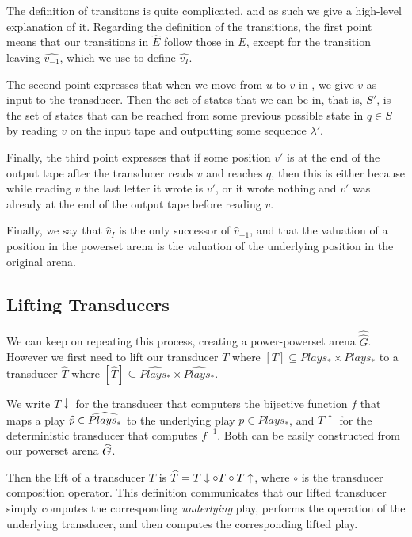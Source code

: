 \documentclass[10pt, a4paper]{report}
\begin{document}
The definition of transitons is quite complicated, and as such we give a high-level
explanation of it. Regarding the definition of the transitions,
the first point means that our transitions in $\widehat{E}$ follow those in $E$,
except for the transition leaving $\widehat{v_{-1}}$, which we use to define
$\widehat{v_I}$. 

The second point expresses that when we move from $u$ to $v$ in , we give
$v$ as input to the transducer. Then the set of states that we can be in, that
is, $S'$, is the set of states that can be reached from some previous possible
state in $q \in S$ by reading $v$ on the input tape and outputting some sequence
$\lambda'$.

Finally, the third point expresses that if some position $v'$ is at the end of
the output tape after the transducer reads $v$ and reaches $q$, then this is either
because while reading $v$ the last letter it wrote is $v'$, or it wrote nothing
and $v'$ was already at the end of the output tape before reading $v$. 

Finally, we say that $\widehat{v}_I$ is the only successor of
$\widehat{v}_{-1}$, and that the valuation of a position in the powerset arena
is the valuation of the underlying position in the original arena. 

\subsection{Lifting Transducers}
\label{sec:LiftingTransducers}

We can keep on repeating this process, creating a power-powerset arena
$\widehat{\widehat{G}}$. However we first need to lift our transducer $T$ where
$[T] \subseteq Plays_\ast \times Plays_\ast$ to a transducer $\widehat{T}$ where
$[\widehat{T}] \subseteq \widehat{Plays_\ast} \times \widehat{Plays_\ast}$.

We write $T\downarrow$ for the transducer that computers the bijective function
$f$ that maps a play $\widehat{p} \in \widehat{Plays_\ast}$ to the underlying play $p
\in Plays_\ast$, and $T\uparrow$ for the deterministic transducer that computes
$f^{-1}$. Both can be easily constructed from our powerset arena $\widehat{G}$.

Then the lift of a transducer $T$ is $\widehat{T} = T\downarrow \circ T \circ
T\uparrow$, where $\circ$ is the transducer composition operator. This
definition communicates that our lifted transducer simply computes the
corresponding \emph{underlying} play, performs the operation of the underlying
transducer, and then computes the corresponding lifted play. 
\end{document}
